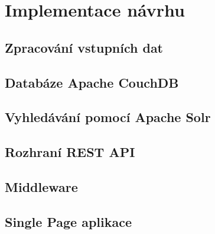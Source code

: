 
\chapter{Implementace návrhu}


\section{Zpracování vstupních dat}


\section{Databáze Apache CouchDB}


\section{Vyhledávání pomocí Apache Solr}


\section{Rozhraní REST API}


\section{Middleware}


\section{Single Page aplikace}